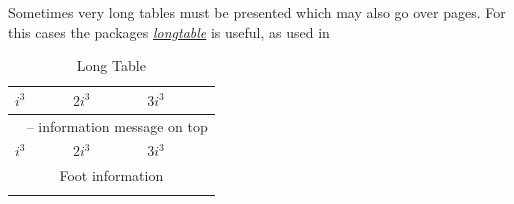 \documentclass[a4paper,11pt,oneside]{book}
\newcommand{\imp}[1]{\underline{\textit{#1}}}
\begin{document}
Sometimes very long tables must be presented which may also go over pages. For this cases the packages \imp{longtable} is useful, as used in 

\begin{center}
	\begin{longtable}{l|l|l}
		
		
		\hline \hline
		$i^3$ & $2i^3$ & $3i^3$ \bigstrut \\ \hline
		\endfirsthead
		
		\multicolumn{3}{c}{\tablename\ \thetable{} -- information message on top} \\
		\hline
		$i^3$ & $2i^3$ & $3i^3$ \bigstrut \\ \hline 
		\endhead
		
		\hline
		\multicolumn{3}{c}{Foot information} \\ \hline
		\endfoot
		
		\hline \hline
		\caption{Long Table}
		\label{lt}
		\endlastfoot
		

\end{longtable}
\end{center}
\end{document}
